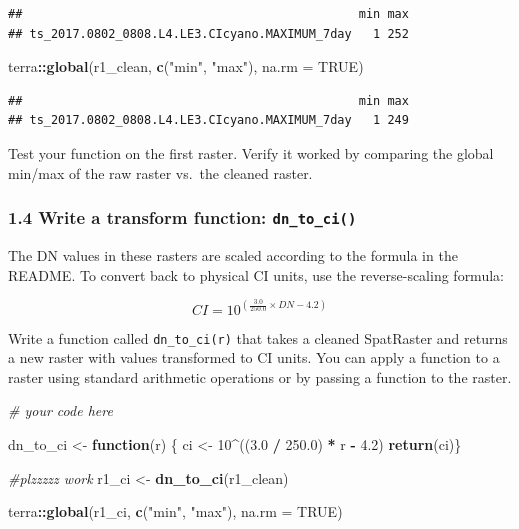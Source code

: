 \documentclass[
]{article}
\newenvironment{Shaded}{\begin{snugshade}}{\end{snugshade}}
\newcommand{\AttributeTok}[1]{\textcolor[rgb]{0.13,0.29,0.53}{#1}}
\newcommand{\CommentTok}[1]{\textcolor[rgb]{0.56,0.35,0.01}{\textit{#1}}}
\newcommand{\ConstantTok}[1]{\textcolor[rgb]{0.56,0.35,0.01}{#1}}
\newcommand{\ControlFlowTok}[1]{\textcolor[rgb]{0.13,0.29,0.53}{\textbf{#1}}}
\newcommand{\DecValTok}[1]{\textcolor[rgb]{0.00,0.00,0.81}{#1}}
\newcommand{\FloatTok}[1]{\textcolor[rgb]{0.00,0.00,0.81}{#1}}
\newcommand{\FunctionTok}[1]{\textcolor[rgb]{0.13,0.29,0.53}{\textbf{#1}}}
\newcommand{\NormalTok}[1]{#1}
\newcommand{\OtherTok}[1]{\textcolor[rgb]{0.56,0.35,0.01}{#1}}
\newcommand{\SpecialCharTok}[1]{\textcolor[rgb]{0.81,0.36,0.00}{\textbf{#1}}}
\newcommand{\StringTok}[1]{\textcolor[rgb]{0.31,0.60,0.02}{#1}}
\begin{document}
\begin{verbatim}
##                                               min max
## ts_2017.0802_0808.L4.LE3.CIcyano.MAXIMUM_7day   1 252
\end{verbatim}

\begin{Shaded}
\begin{Highlighting}[]
\NormalTok{terra}\SpecialCharTok{::}\FunctionTok{global}\NormalTok{(r1\_clean, }\FunctionTok{c}\NormalTok{(}\StringTok{"min"}\NormalTok{, }\StringTok{"max"}\NormalTok{), }\AttributeTok{na.rm =} \ConstantTok{TRUE}\NormalTok{)}
\end{Highlighting}
\end{Shaded}

\begin{verbatim}
##                                               min max
## ts_2017.0802_0808.L4.LE3.CIcyano.MAXIMUM_7day   1 249
\end{verbatim}

Test your function on the first raster. Verify it worked by comparing
the global min/max of the raw raster vs.~the cleaned raster.

\hypertarget{write-a-transform-function-dn_to_ci}{%
\subsubsection{\texorpdfstring{1.4 Write a transform function:
\texttt{dn\_to\_ci()}}{1.4 Write a transform function: dn\_to\_ci()}}\label{write-a-transform-function-dn_to_ci}}

The DN values in these rasters are scaled according to the formula in
the README. To convert back to physical CI units, use the
reverse-scaling formula:

\[CI = 10^{\left(\frac{3.0}{250.0} \times DN - 4.2\right)}\]

Write a function called \texttt{dn\_to\_ci(r)} that takes a cleaned
SpatRaster and returns a new raster with values transformed to CI units.
You can apply a function to a raster using standard arithmetic
operations or by passing a function to the raster.

\begin{Shaded}
\begin{Highlighting}[]
\CommentTok{\# your code here}

\NormalTok{dn\_to\_ci }\OtherTok{\textless{}{-}} \ControlFlowTok{function}\NormalTok{(r) \{}
\NormalTok{  ci }\OtherTok{\textless{}{-}} \DecValTok{10}\SpecialCharTok{\^{}}\NormalTok{((}\FloatTok{3.0} \SpecialCharTok{/} \FloatTok{250.0}\NormalTok{) }\SpecialCharTok{*}\NormalTok{ r }\SpecialCharTok{{-}} \FloatTok{4.2}\NormalTok{)}
  \FunctionTok{return}\NormalTok{(ci)\}}

\CommentTok{\#plzzzzz work }
\NormalTok{r1\_ci }\OtherTok{\textless{}{-}} \FunctionTok{dn\_to\_ci}\NormalTok{(r1\_clean)}

\NormalTok{terra}\SpecialCharTok{::}\FunctionTok{global}\NormalTok{(r1\_ci, }\FunctionTok{c}\NormalTok{(}\StringTok{"min"}\NormalTok{, }\StringTok{"max"}\NormalTok{), }\AttributeTok{na.rm =} \ConstantTok{TRUE}\NormalTok{)}
\end{Highlighting}
\end{Shaded}
\end{document}
